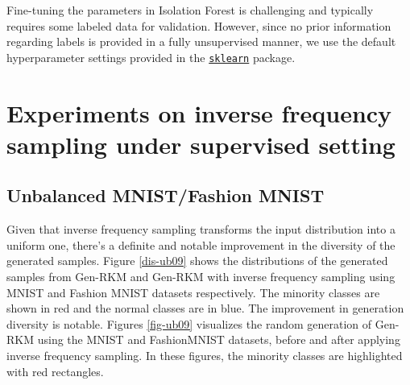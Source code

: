 \begin{description}[leftmargin=0pt]
    \item[Hyperparameters for Iforest sampling] Fine-tuning the parameters in Isolation Forest is challenging and typically requires some labeled data for validation. However, since no prior information regarding labels is provided in a fully unsupervised manner,  we use the default hyperparameter settings provided in the \href{https://scikit-learn.org/stable/modules/generated/sklearn.ensemble.IsolationForest.html}{\texttt{sklearn}} package.
\end{description}



\section{Experiments on inverse frequency sampling under supervised setting}
\label{sec-expr-supervised}

\subsection{Unbalanced MNIST/Fashion MNIST}
Given that inverse frequency sampling transforms the input distribution into a uniform one, there’s a definite and notable improvement in the diversity of the generated samples. Figure \ref{dis-ub09} shows the distributions of the generated samples from Gen-RKM and Gen-RKM with inverse frequency sampling using MNIST and Fashion MNIST datasets respectively. The minority classes are shown in red and the normal classes are in blue. The improvement in generation diversity is notable. Figures \ref{fig-ub09} visualizes the random generation of Gen-RKM using the MNIST and FashionMNIST datasets, before and after applying inverse frequency sampling. In these figures, the minority classes are highlighted with red rectangles. 

